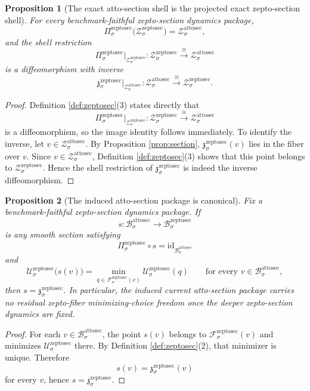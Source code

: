 \documentclass[11pt]{article}
\newcommand{\AttoSectionBody}[1]{\mathcal B_{#1}^{\mathrm{attosec}}}
\newcommand{\AttoSectionShell}[1]{\mathcal Z_{#1}^{\mathrm{attosec}}}
\newcommand{\ZeptoSectionBody}[1]{\mathcal B_{#1}^{\mathrm{zeptosec}}}
\newcommand{\ZeptoSectionProj}[1]{\Pi_{#1}^{\mathrm{zeptosec}}}
\newcommand{\ZeptoSectionFiber}[2]{\mathcal F_{#1}^{\mathrm{zeptosec}}(#2)}
\newcommand{\ZeptoSectionAttoMin}[1]{\mathfrak z_{#1}^{\mathrm{zeptosec}}}
\newcommand{\ZeptoSectionFunctional}[1]{\mathscr U_{#1}^{\mathrm{zeptosec}}}
\newcommand{\ZeptoSectionShell}[1]{\mathcal Z_{#1}^{\mathrm{zeptosec}}}
\newtheorem{proposition}{Proposition}
\begin{document}
\begin{proposition}[The exact atto-section shell is the projected exact zepto-section shell]
\label{prop:shell}
For every benchmark-faithful zepto-section dynamics package,
\[
\ZeptoSectionProj{\sigma}\bigl(\ZeptoSectionShell{\sigma}\bigr)
=
\AttoSectionShell{\sigma},
\]
and the shell restriction
\[
\ZeptoSectionProj{\sigma}\big|_{\ZeptoSectionShell{\sigma}}
:
\ZeptoSectionShell{\sigma}\xrightarrow{\cong}\AttoSectionShell{\sigma}
\]
is a diffeomorphism with inverse
\[
\ZeptoSectionAttoMin{\sigma}\big|_{\AttoSectionShell{\sigma}}
:
\AttoSectionShell{\sigma}\xrightarrow{\cong}\ZeptoSectionShell{\sigma}.
\]
\end{proposition}

\begin{proof}
Definition \ref{def:zeptosec}(3) states directly that
\[
\ZeptoSectionProj{\sigma}\big|_{\ZeptoSectionShell{\sigma}}
:
\ZeptoSectionShell{\sigma}\xrightarrow{\cong}\AttoSectionShell{\sigma}
\]
is a diffeomorphism, so the image identity follows immediately. To identify the inverse, let \(v\in\AttoSectionShell{\sigma}\). By Proposition \ref{prop:section}, \(\ZeptoSectionAttoMin{\sigma}(v)\) lies in the fiber over \(v\). Since \(v\in\AttoSectionShell{\sigma}\), Definition \ref{def:zeptosec}(3) shows that this point belongs to \(\ZeptoSectionShell{\sigma}\). Hence the shell restriction of \(\ZeptoSectionAttoMin{\sigma}\) is indeed the inverse diffeomorphism.
\end{proof}

\begin{proposition}[The induced atto-section package is canonical]
\label{prop:canonical}
Fix a benchmark-faithful zepto-section dynamics package. If
\[
s:\AttoSectionBody{\sigma}\to\ZeptoSectionBody{\sigma}
\]
is any smooth section satisfying
\[
\ZeptoSectionProj{\sigma}\circ s
=
\mathrm{id}_{\AttoSectionBody{\sigma}}
\]
and
\[
\ZeptoSectionFunctional{\sigma}\bigl(s(v)\bigr)
=
\min_{q\in\ZeptoSectionFiber{\sigma}{v}}
\ZeptoSectionFunctional{\sigma}(q)
\qquad
\text{for every }
v\in\AttoSectionBody{\sigma},
\]
then \(s=\ZeptoSectionAttoMin{\sigma}\). In particular, the induced current atto-section package carries no residual zepto-fiber minimizing-choice freedom once the deeper zepto-section dynamics are fixed.
\end{proposition}

\begin{proof}
For each \(v\in\AttoSectionBody{\sigma}\), the point \(s(v)\) belongs to \(\ZeptoSectionFiber{\sigma}{v}\) and minimizes \(\ZeptoSectionFunctional{\sigma}\) there. By Definition \ref{def:zeptosec}(2), that minimizer is unique. Therefore
\[
s(v)=\ZeptoSectionAttoMin{\sigma}(v)
\]
for every \(v\), hence \(s=\ZeptoSectionAttoMin{\sigma}\).
\end{proof}
\end{document}
